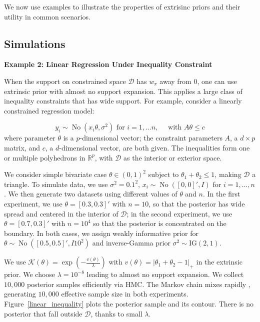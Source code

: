 \documentclass[10pt]{article}
\newcommand{\mc}[1]{\mathcal{#1}}
\DeclareMathOperator{\No}{No}
\DeclareMathOperator{\1}{\mathbbm{1}}
\begin{document}
We now use examples to illustrate the properties of extrisinc priors and their utility in common scenarios.

\subsection{Simulations}

{\bf Example 2: Linear Regression Under Inequality Constraint}

When the support on constrained space $\mc D$ has $w_\pi$ away from $0$, one can use extrinsic prior with almost no support expansion. This applies a large class of inequality constraints that has wide support. For example, consider a linearly constrained regression model:

$$y_i \sim \No (x_i \theta, \sigma^2) \text{ for } i=1,\ldots n, \quad\text{ with } A\theta \le c$$
where parameter $\theta$ is a $p$-dimensional vector; the constraint parameters $A$, a $d\times p$ matrix, and $c$, a $d$-dimensional vector, are both given. The inequalities form one or multiple polyhedrons in $\mathbb R^p$, with $\mc D$ as the interior or exterior space.

We consider simple bivariate case $\theta \in (0,1)^2$ subject to $\theta_1+\theta_2\le 1$, making $\mc D$ a triangle. To simulate data, we use $\sigma^2=0.1^2$, $x_i\sim \No([0,0]',I)$ for $i=1,\ldots,n$. We then generate two datasets using different values of $\theta$ and $n$. In the first experiment, we use $\theta=[0.3,0.3]'$ with $n=10$, so that the posterior has wide spread and centered in the interior of $\mc D$; in the second experiment, we use $\theta=[0.7,0.3]'$ with $n=10^4$ so that the posterior is concentrated on the boundary. In both cases, we assign weakly informative prior for $\theta\sim \No([0.5, 0.5]',I10^2)$ and inverse-Gamma prior $\sigma^2\sim \text{IG}(2,1)$.

We use $\mc K(\theta)=\exp( - \frac{v(\theta)}{\lambda})$ with $v(\theta)=|\theta_1+\theta_2-1|_{+}$ in the extrinsic prior. We choose $\lambda=10^{-8}$ leading to almost no support expansion. We collect $10,000$ posterior samples efficiently via HMC. The Markov chain mixes rapidly , generating $10,000$ effective sample size in both experiments. Figure~\ref{linear_inequality} plots the posterior sample and its contour. There is no posterior that fall outside $\mc D$, thanks to small $\lambda$.
\end{document}
